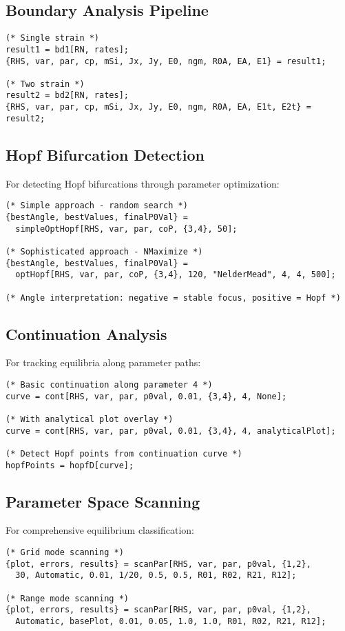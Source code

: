 \documentclass{article}
\begin{document}
\subsection{Boundary Analysis Pipeline}
\begin{lstlisting}
(* Single strain *)
result1 = bd1[RN, rates];
{RHS, var, par, cp, mSi, Jx, Jy, E0, ngm, R0A, EA, E1} = result1;

(* Two strain *)
result2 = bd2[RN, rates];
{RHS, var, par, cp, mSi, Jx, Jy, E0, ngm, R0A, EA, E1t, E2t} = result2;
\end{lstlisting}

\subsection{Hopf Bifurcation Detection}
For detecting Hopf bifurcations through parameter optimization:

\begin{lstlisting}
(* Simple approach - random search *)
{bestAngle, bestValues, finalP0Val} =
  simpleOptHopf[RHS, var, par, coP, {3,4}, 50];

(* Sophisticated approach - NMaximize *)
{bestAngle, bestValues, finalP0Val} =
  optHopf[RHS, var, par, coP, {3,4}, 120, "NelderMead", 4, 4, 500];

(* Angle interpretation: negative = stable focus, positive = Hopf *)
\end{lstlisting}

\subsection{Continuation Analysis}
For tracking equilibria along parameter paths:

\begin{lstlisting}
(* Basic continuation along parameter 4 *)
curve = cont[RHS, var, par, p0val, 0.01, {3,4}, 4, None];

(* With analytical plot overlay *)
curve = cont[RHS, var, par, p0val, 0.01, {3,4}, 4, analyticalPlot];

(* Detect Hopf points from continuation curve *)
hopfPoints = hopfD[curve];
\end{lstlisting}

\subsection{Parameter Space Scanning}
For comprehensive equilibrium classification:

\begin{lstlisting}
(* Grid mode scanning *)
{plot, errors, results} = scanPar[RHS, var, par, p0val, {1,2},
  30, Automatic, 0.01, 1/20, 0.5, 0.5, R01, R02, R21, R12];

(* Range mode scanning *)
{plot, errors, results} = scanPar[RHS, var, par, p0val, {1,2},
  Automatic, basePlot, 0.01, 0.05, 1.0, 1.0, R01, R02, R21, R12];
\end{lstlisting}
\end{document}
